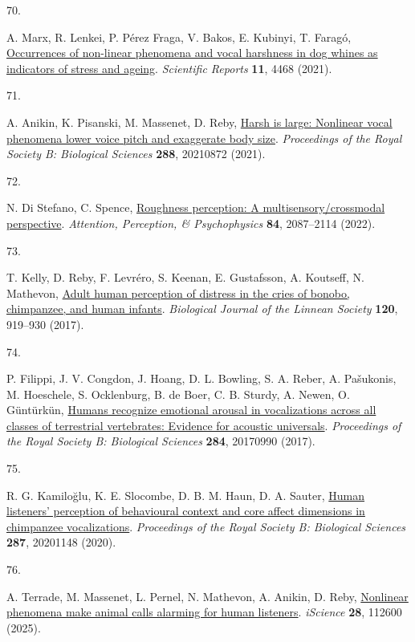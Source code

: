 \documentclass[
]{article}
\newlength{\cslhangindent}
\newlength{\csllabelwidth}
\newenvironment{CSLReferences}[2] %
 {\begin{list}{}{%
  \setlength{\itemindent}{0pt}
  \setlength{\leftmargin}{0pt}
  \setlength{\parsep}{0pt}
  \ifodd #1
   \setlength{\leftmargin}{\cslhangindent}
   \setlength{\itemindent}{-1\cslhangindent}
  \fi
  \setlength{\itemsep}{#2\baselineskip}}}
 {\end{list}}
\newcommand{\CSLLeftMargin}[1]{\parbox[t]{\csllabelwidth}{\strut#1\strut}}
\newcommand{\CSLRightInline}[1]{\parbox[t]{\linewidth - \csllabelwidth}{\strut#1\strut}}
\begin{document}
\begin{CSLReferences}{0}{0}
\CSLLeftMargin{70. }%
\CSLRightInline{A. Marx, R. Lenkei, P. Pérez Fraga, V. Bakos, E.
Kubinyi, T. Faragó,
\href{https://doi.org/10.1038/s41598-021-83614-1}{Occurrences of
non-linear phenomena and vocal harshness in dog whines as indicators of
stress and ageing}. \emph{Scientific Reports} \textbf{11}, 4468 (2021).}

\CSLLeftMargin{71. }%
\CSLRightInline{A. Anikin, K. Pisanski, M. Massenet, D. Reby,
\href{https://doi.org/10.1098/rspb.2021.0872}{Harsh is large: Nonlinear
vocal phenomena lower voice pitch and exaggerate body size}.
\emph{Proceedings of the Royal Society B: Biological Sciences}
\textbf{288}, 20210872 (2021).}

\CSLLeftMargin{72. }%
\CSLRightInline{N. Di Stefano, C. Spence,
\href{https://doi.org/10.3758/s13414-022-02550-y}{Roughness perception:
{A} multisensory/crossmodal perspective}. \emph{Attention, Perception,
\& Psychophysics} \textbf{84}, 2087--2114 (2022).}

\CSLLeftMargin{73. }%
\CSLRightInline{T. Kelly, D. Reby, F. Levréro, S. Keenan, E. Gustafsson,
A. Koutseff, N. Mathevon,
\href{https://doi.org/10.1093/biolinnean/blw016}{Adult human perception
of distress in the cries of bonobo, chimpanzee, and human infants}.
\emph{Biological Journal of the Linnean Society} \textbf{120}, 919--930
(2017).}

\CSLLeftMargin{74. }%
\CSLRightInline{P. Filippi, J. V. Congdon, J. Hoang, D. L. Bowling, S.
A. Reber, A. Pašukonis, M. Hoeschele, S. Ocklenburg, B. de Boer, C. B.
Sturdy, A. Newen, O. Güntürkün,
\href{https://doi.org/10.1098/rspb.2017.0990}{Humans recognize emotional
arousal in vocalizations across all classes of terrestrial vertebrates:
Evidence for acoustic universals}. \emph{Proceedings of the Royal
Society B: Biological Sciences} \textbf{284}, 20170990 (2017).}

\CSLLeftMargin{75. }%
\CSLRightInline{R. G. Kamiloğlu, K. E. Slocombe, D. B. M. Haun, D. A.
Sauter, \href{https://doi.org/10.1098/rspb.2020.1148}{Human listeners'
perception of behavioural context and core affect dimensions in
chimpanzee vocalizations}. \emph{Proceedings of the Royal Society B:
Biological Sciences} \textbf{287}, 20201148 (2020).}

\CSLLeftMargin{76. }%
\CSLRightInline{A. Terrade, M. Massenet, L. Pernel, N. Mathevon, A.
Anikin, D. Reby,
\href{https://doi.org/10.1016/j.isci.2025.112600}{Nonlinear phenomena
make animal calls alarming for human listeners}. \emph{iScience}
\textbf{28}, 112600 (2025).}


\end{CSLReferences}
\end{document}
